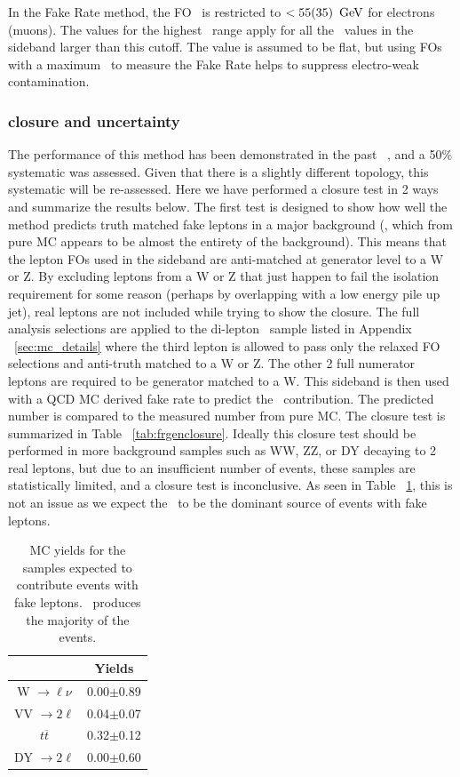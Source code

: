 In the Fake Rate method, the FO \pt \ is restricted to $< 55(35) \ \,\text{Ge\hspace{-.08em}V}$ for electrons (muons). The values for the highest \pt \ range apply for all the \pt \ values in the sideband larger than this cutoff. The value is assumed to be flat, but using FOs with a maximum \pt \ to measure the Fake Rate helps to suppress electro-weak contamination.


\subsubsection{closure and uncertainty}
The performance of this method has been demonstrated in the past ~\cite{sspaper2011}, and a 50\% systematic was assessed. Given that there is a slightly different topology, this systematic will be re-assessed. Here we have performed a closure test in 2 ways and summarize the results below. The first test is designed to show how well the method predicts truth matched fake leptons in a major background (\ttbar, which from pure MC appears to be almost the entirety of the background). This means that the lepton FOs used in the sideband are anti-matched at generator level to a W or Z. By excluding leptons from a W or Z that just happen to fail the isolation requirement for some reason (perhaps by overlapping with a low energy pile up jet), real leptons are not included while trying to show the closure. The full analysis selections are applied to the di-lepton \ttbar \ sample listed in Appendix ~\ref{sec:mc_details} where the third lepton is allowed to pass only the relaxed FO selections and anti-truth matched to a W or Z. The other 2 full numerator leptons are required to be generator matched to a W. This sideband is then used with a QCD MC derived fake rate to predict the \ttbar \ contribution. The predicted number is compared to the measured number from pure MC. The closure test is summarized in Table ~\ref{tab:frgenclosure}. Ideally this closure test should be performed in more background samples such as WW, ZZ, or DY decaying to 2 real leptons, but due to an insufficient number of events, these samples are statistically limited, and a closure test is inconclusive. As seen in Table ~\ref{tab:fakeMCYields}, this is not an issue as we expect the \ttbar \ to be the dominant source of events with fake leptons.\\


\begin{table}[ht!]
\begin{center}
\caption{\small \label{tab:fakeMCYields} MC yields for the samples expected to contribute events with fake leptons. \ttbar \ produces the majority of the events.}
\begin{tabular}{c|c}\hline
&Yields\\
\hline \hline
W $\rightarrow \ell \nu$ &   0.00$\pm$0.89 \\
VV $\rightarrow 2 \ell$ &    0.04$\pm$0.07 \\
$t\overline{t}$     &        0.32$\pm$0.12 \\
DY $\rightarrow 2 \ell$  &   0.00$\pm$0.60 \\
\hline
\end{tabular}
\end{center}
\end{table}


